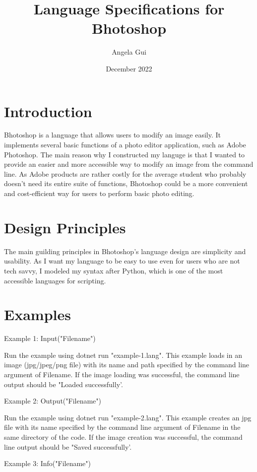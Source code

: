 \documentclass{article}
\title{Language Specifications for Bhotoshop}
\author{Angela Gui}
\date{December 2022}
\begin{document}
\maketitle

\section{Introduction}

Bhotoshop is a language that allows users to modify an image easily. It implements several basic functions of a photo editor application, such as Adobe Photoshop. The main reason why I constructed my languge is that I wanted to provide an easier and more accessible way to modify an image from the command line. As Adobe products are rather costly for the average student who probably doesn't need its entire suite of functions, Bhotoshop could be a more convenient and cost-efficient way for users to perform basic photo editing.

\section{Design Principles}

The main guilding principles in Bhotoshop's language design are simplicity and usability. As I want my language to be easy to use even for users who are not tech savvy, I modeled my syntax after Python, which is one of the most accessible languages for scripting. 

\section{Examples}

    Example 1: Input("Filename")

Run the example using dotnet run "example-1.lang". This example loads in an image (jpg/jpeg/png file) with its name and path specified by the command line argument of Filename. If the image loading was successful, the command line output should be "Loaded successfully'.

Example 2: Output("Filename")

Run the example using dotnet run "example-2.lang". This example creates an jpg file with its name specified by the command line argument of Filename in the same directory of the code. If the image creation was successful, the command line output should be "Saved successfully'.

Example 3: Info("Filename")
\end{document}
